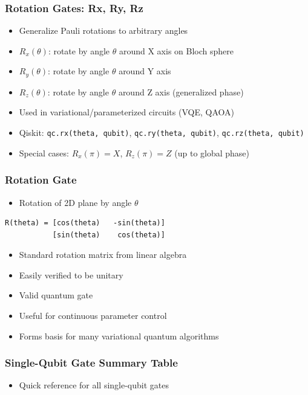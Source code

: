 \begin{frame}[fragile]\frametitle{Rotation Gates: Rx, Ry, Rz}
\begin{itemize}
\item Generalize Pauli rotations to arbitrary angles
\item $R_x(\theta)$: rotate by angle $\theta$ around X axis on Bloch sphere
\item $R_y(\theta)$: rotate by angle $\theta$ around Y axis
\item $R_z(\theta)$: rotate by angle $\theta$ around Z axis (generalized phase)
\item Used in variational/parameterized circuits (VQE, QAOA)
\item Qiskit: \texttt{qc.rx(theta, qubit)}, \texttt{qc.ry(theta, qubit)}, \texttt{qc.rz(theta, qubit)}
\item Special cases: $R_x(\pi) = X$, $R_z(\pi) = Z$ (up to global phase)
\end{itemize}
\end{frame}

\begin{frame}[fragile]\frametitle{Rotation Gate}
\begin{itemize}
\item Rotation of 2D plane by angle $\theta$
\end{itemize}
\begin{lstlisting}
R(theta) = [cos(theta)   -sin(theta)]
           [sin(theta)    cos(theta)]
\end{lstlisting}
\begin{itemize}
\item Standard rotation matrix from linear algebra
\item Easily verified to be unitary
\item Valid quantum gate
\item Useful for continuous parameter control
\item Forms basis for many variational quantum algorithms
\end{itemize}
\end{frame}

\begin{frame}[fragile]\frametitle{Single-Qubit Gate Summary Table}
\begin{itemize}
\item Quick reference for all single-qubit gates
\end{itemize}
\begin{center}
\end{center}
\end{frame}

